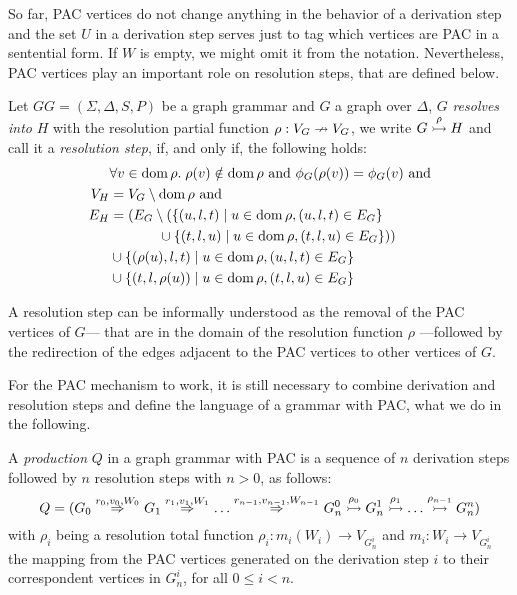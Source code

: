 So far, PAC vertices do not change anything in the behavior of a derivation step and the set $U$ in a derivation step serves just to tag which vertices are PAC in a sentential form. If $W$ is empty, we might omit it from the notation. Nevertheless, PAC vertices play an important role on resolution steps, that are defined below. 

\begin{definition}
	\label{def:resolv}
	Let $GG = (\Sigma, \Delta, S, P)$ be a graph grammar and $G$ a graph over $\Delta$, $G$ \emph{resolves into} $H$ with the resolution partial function $\rho: V_G \nrightarrow V_G$, we write $G \overset{\rho}{\rightarrowtail} H$ and call it a \emph{resolution step}, if, and only if, the following holds:
	\begin{align*}
		& \forall v \in \operatorname{dom} \rho . \; \rho(v) \notin \operatorname{dom} \rho \text{ and } \phi_G(\rho(v)) = \phi_G(v) \text{ and}\\
		V_H & = V_G \setminus \operatorname{dom} \rho \text{ and}\\
		E_H & = (E_G \setminus (\{(u,l,t) \; | \; u \in \operatorname{dom} \rho, (u,l,t) \in E_G\} \\
			&\hspace{3.5em} \cup \{(t,l,u) \; | \; u \in \operatorname{dom} \rho, (t,l,u) \in E_G\}))\\
		    & \cup \{(\rho(u),l,t) \; | \; u \in \operatorname{dom} \rho, (u,l,t) \in E_G\} \\
		    & \cup \{(t,l,\rho(u)) \; | \; u \in \operatorname{dom} \rho, (t,l,u) \in E_G\}
	\end{align*}
\end{definition}

A resolution step can be informally understood as the removal of the PAC vertices of $G$--- that are in the domain of the resolution function $\rho$ ---followed by the redirection of the edges adjacent to the PAC vertices to other vertices of $G$.

For the PAC mechanism to work, it is still necessary to combine derivation and resolution steps and define the language of a grammar with PAC, what we do in the following.

\begin{definition}
	A \emph{production} $Q$ in a graph grammar with PAC is a sequence of $n$ derivation steps followed by $n$ resolution steps with $n > 0$, as follows:
	\begin{equation*}
		Q = (G_0 \derivpac{r_0}{v_0}{W_0}{} G_1 \derivpac{r_1}{v_1}{W_1}{} \dots \derivpac{r_{n-1}}{v_{n-1}}{W_{n-1}}{} G_n^0 \resolv{\rho_0} G_n^1 \resolv{\rho_1} \dots \resolv{\rho_{n-1}} G_n^n)
	\end{equation*}
	with $\rho_i$ being a resolution total function $\rho_i : m_i(W_i) \to V_{G_n^i}$ and $m_i : W_i \to V_{G_n^i}$ the mapping from the PAC vertices generated on the derivation step $i$ to their correspondent vertices in $G_n^i$, for all $0 \le i < n$.
\end{definition}

